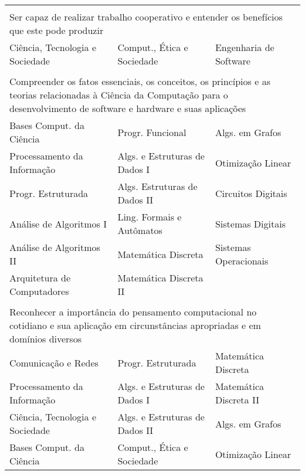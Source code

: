 \begin{longtable}{|p{}p{}p{}|}
    \multicolumn{3}{p{0.95\textwidth}}{}\\
    \multicolumn{3}{p{0.95\textwidth}}{Ser capaz de realizar trabalho cooperativo e entender os
    benefícios que este pode produzir}\\
    \hline
    \textcolor{nred}{Ciência, Tecnologia e Sociedade} &
    \textcolor{nblue}{Comput., Ética e Sociedade} &
    \textcolor{nblue}{Engenharia de Software}\\
    \hline
    
    \multicolumn{3}{p{0.95\textwidth}}{}\\
    \multicolumn{3}{p{0.95\textwidth}}{Compreender os fatos essenciais, os
    conceitos, os princípios e as teorias relacionadas à Ciência da Computação
    para o desenvolvimento de software e hardware e suas aplicações}\\
    \hline
    \textcolor{nred}{Bases Comput. da Ciência} &
    \textcolor{nblue}{Progr. Funcional} & 
    \textcolor{nblue}{Algs. em Grafos} \\
    \textcolor{nred}{Processamento da Informação} &
    \textcolor{nblue}{Algs. e Estruturas de Dados I} &
    \textcolor{nyellow}{Otimização Linear}\\
    \textcolor{nblue}{Progr. Estruturada} & 
    \textcolor{nblue}{Algs. Estruturas de Dados II} &
    \textcolor{nblue}{Circuitos Digitais}\\
    \textcolor{nblue}{Análise de Algoritmos I} &
    \textcolor{nblue}{Ling. Formais e Autômatos} &
    \textcolor{nblue}{Sistemas Digitais}\\
    \textcolor{nblue}{Análise de Algoritmos II} &
    \textcolor{nblue}{Matemática Discreta} &
    \textcolor{nblue}{Sistemas Operacionais}\\
    \textcolor{nblue}{Arquitetura de Computadores} & 
    \textcolor{nblue}{Matemática Discreta II} & \\
    \hline
    
    \multicolumn{3}{p{0.95\textwidth}}{}\\
    \multicolumn{3}{p{0.95\textwidth}}{Reconhecer a importância do pensamento
    computacional no cotidiano e sua aplicação em circunstâncias apropriadas e
    em domínios diversos}\\
    \hline
    \textcolor{nred}{Comunicação e Redes} &
    \textcolor{nblue}{Progr. Estruturada} &
    \textcolor{nblue}{Matemática Discreta} \\
    \textcolor{nred}{Processamento da Informação} &
    \textcolor{nblue}{Algs. e Estruturas de Dados I}&
    \textcolor{nblue}{Matemática Discreta II}\\
    \textcolor{nred}{Ciência, Tecnologia e Sociedade} &
    \textcolor{nblue}{Algs. e Estruturas de Dados II}&
    \textcolor{nblue}{Algs. em Grafos}\\
    \textcolor{nred}{Bases Comput. da Ciência} &
    \textcolor{nblue}{Comput., Ética e Sociedade} &
    \textcolor{nyellow}{Otimização Linear}\\
    \hline
    

\end{longtable}
